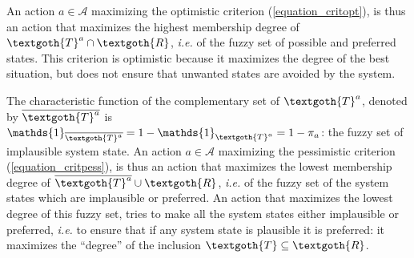 An action $a \in \mathcal{A}$ maximizing the optimistic criterion (\ref{equation_critopt}),
is thus an action that maximizes the highest membership degree of $\textgoth{T}^a \cap \textgoth{R}$,
\textit{i.e.} of the fuzzy set of possible and preferred states.
This criterion is optimistic because it maximizes
the degree of the best situation, but does not ensure that 
unwanted states are avoided by the system.
 
The characteristic function of the complementary set of $\textgoth{T}^a$, denoted by $\overline{\textgoth{T}^a}$ 
is $\mathds{1}_{\overline{\textgoth{T}^a}} = 1 - \mathds{1}_{\textgoth{T}^a} = 1- \pi_a$:
the fuzzy set of implausible system state.
An action $a \in \mathcal{A}$ maximizing the pessimistic criterion (\ref{equation_critpess}),
is thus an action that maximizes the lowest membership degree of $\overline{\textgoth{T}^a} \cup \textgoth{R}$,
\textit{i.e.} of the fuzzy set of the system states which are implausible or preferred.
An action that maximizes the lowest degree of this fuzzy set,
tries to make all the system states either implausible or preferred,
\textit{i.e.} to ensure that if any system state is plausible it is preferred:
it maximizes the ``degree'' of the inclusion $\textgoth{T} \subseteq \textgoth{R}$.

